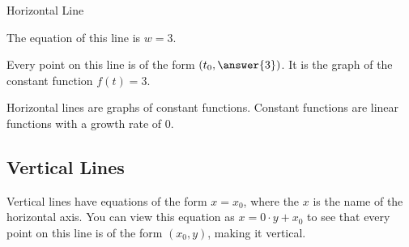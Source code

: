\documentclass{ximera}
\begin{document}
\begin{example} Horizontal Line





The equation of this line is $w=3$.  

\begin{image}
\end{image}

Every point on this line is of the form $\left(t_0, \answer{3}\right)$. It is the graph of the constant function $f(t)=3$.


\end{example}
Horizontal lines are graphs of constant functions.  Constant functions are linear functions with a growth rate of $0$. \\
















\subsection*{Vertical Lines} 


Vertical lines have equations of the form $x = x_0$, where the $x$ is the name of the horizontal axis. You can view this equation as $x = 0 \cdot y + x_0$ to see that every point on this line is of the form $(x_0,y)$, making it vertical.
\end{document}
